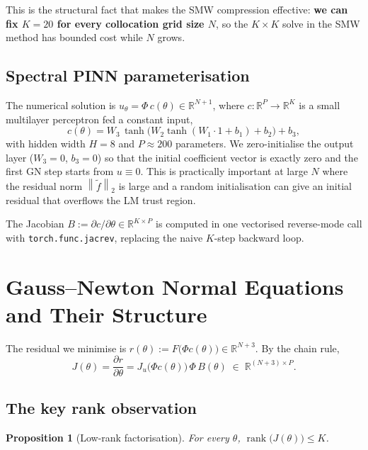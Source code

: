 \documentclass[11pt,a4paper]{article}
\newcommand{\R}{\mathbb{R}}
\newcommand{\norm}[1]{\left\lVert #1 \right\rVert}
\newcommand{\rank}{\operatorname{rank}}
\newtheorem{proposition}{Proposition}
\begin{document}
\noindent This is the structural fact that makes the SMW compression effective:
\textbf{we can fix $K=20$ for every collocation grid size $N$}, so the $K\times K$
solve in the SMW method has bounded cost while $N$ grows.

\subsection{Spectral PINN parameterisation}

The numerical solution is
$u_{\theta} = \Phi\, c(\theta)\in\R^{N+1}$, where $c:\R^{P}\to\R^{K}$ is a
small multilayer perceptron fed a constant input,
\begin{equation}
c(\theta) = W_{3}\,\tanh\!\bigl(W_{2}\tanh(W_{1}\cdot 1 + b_{1}) + b_{2}\bigr) + b_{3},
\label{eq:mlp}
\end{equation}
with hidden width $H=8$ and $P\approx 200$ parameters. We zero-initialise the
output layer ($W_{3} = 0$, $b_{3} = 0$) so that the initial coefficient vector
is exactly zero and the first GN step starts from $u\equiv 0$. This is
practically important at large $N$ where the residual norm $\norm{\tilde f}_{2}$
is large and a random initialisation can give an initial residual that overflows
the LM trust region.

The Jacobian $B := \partial c/\partial\theta\in\R^{K\times P}$ is computed in
one vectorised reverse-mode call with \texttt{torch.func.jacrev}, replacing the
naive $K$-step backward loop.

\section{Gauss--Newton Normal Equations and Their Structure}
\label{sec:gn}

The residual we minimise is $r(\theta) := F\bigl(\Phi c(\theta)\bigr)\in\R^{N+3}$.
By the chain rule,
\begin{equation}
J(\theta) = \frac{\partial r}{\partial \theta} = J_{u}\!\bigl(\Phi c(\theta)\bigr)\,\Phi\, B(\theta) \;\in\; \R^{(N+3)\times P}.
\label{eq:Jchain}
\end{equation}

\subsection{The key rank observation}

\begin{proposition}[Low-rank factorisation]
\label{prop:rank}
For every $\theta$, $\rank\bigl(J(\theta)\bigr) \le K$.
\end{proposition}
\end{document}
